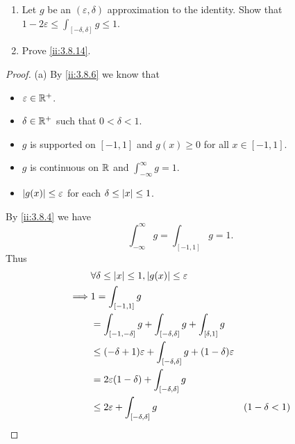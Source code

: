 \begin{ex}\label{ii:ex:3.8.6}
  \quad
  \begin{enumerate}
    \item Let \(g\) be an \((\varepsilon, \delta)\) approximation to the identity.
          Show that \(1 - 2 \varepsilon \leq \int_{[-\delta, \delta]} g \leq 1\).
    \item Prove \cref{ii:3.8.14}.
  \end{enumerate}
\end{ex}

\begin{proof}{(a)}
  By \cref{ii:3.8.6} we know that
  \begin{itemize}
    \item \(\varepsilon \in \mathbb{R}^+\).
    \item \(\delta \in \mathbb{R}^+\) such that \(0 < \delta < 1\).
    \item \(g\) is supported on \([-1, 1]\) and \(g(x) \geq 0\) for all \(x \in [-1, 1]\).
    \item \(g\) is continuous on \(\mathbb{R}\) and \(\int_{-\infty}^\infty g = 1\).
    \item \(\left\lvert g(x)\right\rvert \leq \varepsilon\) for each \(\delta \leq \left\lvert x\right\rvert \leq 1\).
  \end{itemize}
  By \cref{ii:3.8.4} we have
  \[
    \int_{-\infty}^\infty g = \int_{[-1, 1]} g = 1.
  \]
  Thus
  \begin{align*}
             & \forall \delta \leq \abs{x} \leq 1, \abs{g(x)} \leq \varepsilon                                                                                \\
    \implies & 1 = \int_{[-1, 1]} g                                                                                                                           \\
             & = \int_{[-1, -\delta]} g + \int_{[-\delta, \delta]} g + \int_{[\delta, 1]} g                                                                   \\
             & \leq (-\delta + 1) \varepsilon + \int_{[-\delta, \delta]} g + (1 - \delta) \varepsilon                                                         \\
             & = 2 \varepsilon (1 - \delta) + \int_{[-\delta, \delta]} g                                                                                      \\
             & \leq 2 \varepsilon + \int_{[-\delta, \delta]} g                                                 & (1 - \delta < 1)                             \\

\end{align*}
\end{proof}
